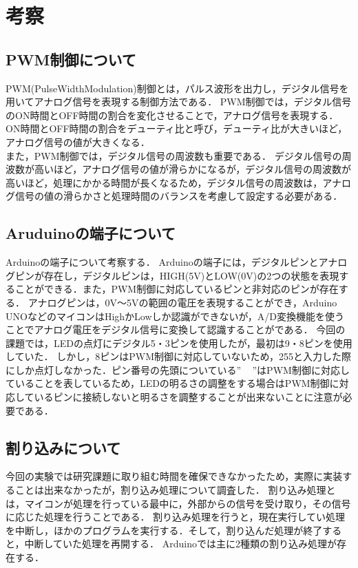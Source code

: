 \documentclass{ltjsarticle}
\begin{document}
\section{考察}

\subsection*{PWM制御について}
PWM(PulseWidthModulation)制御とは，パルス波形を出力し，デジタル信号を用いてアナログ信号を表現する制御方法である．
PWM制御では，デジタル信号のON時間とOFF時間の割合を変化させることで，アナログ信号を表現する．
ON時間とOFF時間の割合をデューティ比と呼び，デューティ比が大きいほど，アナログ信号の値が大きくなる．\\
また，PWM制御では，デジタル信号の周波数も重要である．
デジタル信号の周波数が高いほど，アナログ信号の値が滑らかになるが，デジタル信号の周波数が高いほど，処理にかかる時間が長くなるため，デジタル信号の周波数は，アナログ信号の値の滑らかさと処理時間のバランスを考慮して設定する必要がある．

\subsection*{Aruduinoの端子について}
Arduinoの端子について考察する．
Arduinoの端子には，デジタルピンとアナログピンが存在し，デジタルピンは，HIGH(5V)とLOW(0V)の2つの状態を表現することができる．また，PWM制御に対応しているピンと非対応のピンが存在する．
アナログピンは，0V～5Vの範囲の電圧を表現することができ，Arduino UNOなどのマイコンはHighかLowしか認識ができないが，A/D変換機能を使うことでアナログ電圧をデジタル信号に変換して認識することがである．\cite{key}
今回の課題では，LEDの点灯にデジタル5・3ピンを使用したが，最初は9・8ピンを使用していた．
しかし，8ピンはPWM制御に対応していないため，255と入力した際にしか点灯しなかった．ピン番号の先頭についている” ~ ”はPWM制御に対応していることを表しているため，LEDの明るさの調整をする場合はPWM制御に対応しているピンに接続しないと明るさを調整することが出来ないことに注意が必要である．

\subsection*{割り込みについて}
今回の実験では研究課題に取り組む時間を確保できなかったため，実際に実装することは出来なかったが，割り込み処理について調査した．
割り込み処理とは，マイコンが処理を行っている最中に，外部からの信号を受け取り，その信号に応じた処理を行うことである．
割り込み処理を行うと，現在実行してい処理を中断し，ほかのプログラムを実行する．そして，割り込んだ処理が終了すると，中断していた処理を再開する．
Arduinoでは主に2種類の割り込み処理が存在する．
\end{document}
